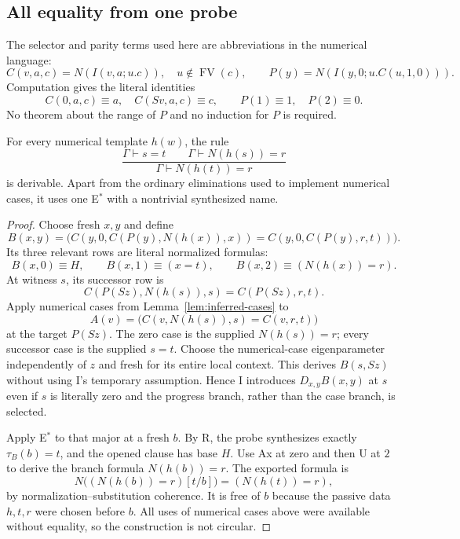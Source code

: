 \subsection{All equality from one probe}

The selector and parity terms used here are abbreviations in the numerical
language:
\[
 C(v,a,c)=N(I(v,a;u.c)),\quad u\notin\operatorname{FV}(c),
 \qquad P(y)=N(I(y,0;u.C(u,1,0))).
\]
Computation gives the literal identities
\[
 C(0,a,c)\equiv a,\quad C(Sv,a,c)\equiv c,
 \qquad P(1)\equiv1,\quad P(2)\equiv0.
\]
No theorem about the range of $P$ and no induction for $P$ is required.

\begin{theorem}
\label{thm:inferred-transport}
For every numerical template $h(w)$, the rule
\[
 \frac{\Gamma\vdash s=t\qquad\Gamma\vdash N(h(s))=r}
      {\Gamma\vdash N(h(t))=r}
\]
is derivable. Apart from the ordinary eliminations used to implement
numerical cases, it uses one E$^*$ with a nontrivial synthesized name.
\end{theorem}
\begin{proof}
Choose fresh $x,y$ and define
\[
 B(x,y)=
 \bigl(C(y,0,C(P(y),N(h(x)),x))
      =C(y,0,C(P(y),r,t))\bigr).
\]
Its three relevant rows are literal normalized formulas:
\[
 B(x,0)\equiv H,\qquad B(x,1)\equiv(x=t),\qquad
 B(x,2)\equiv(N(h(x))=r).
 \tag{R}
\]
At witness $s$, its successor row is
\[
 C(P(Sz),N(h(s)),s)=C(P(Sz),r,t).
\]
Apply numerical cases from Lemma~\ref{lem:inferred-cases} to
\[
 A(v)=\bigl(C(v,N(h(s)),s)=C(v,r,t)\bigr)
\]
at the target $P(Sz)$. The zero case is the supplied $N(h(s))=r$;
every successor case is the supplied $s=t$. Choose the numerical-case
eigenparameter independently of $z$ and fresh for its entire local context.
This derives $B(s,Sz)$ without using I's temporary assumption. Hence I
introduces $D_{x,y}B(x,y)$ at $s$ even if $s$ is literally zero and the
progress branch, rather than the case branch, is selected.

Apply E$^*$ to that major at a fresh $b$. By R, the probe synthesizes
exactly $\tau_B(b)=t$, and the opened clause has base $H$. Use Ax at zero
and then U at $2$ to derive the branch formula $N(h(b))=r$.
The exported formula is
\[
 N\bigl((N(h(b))=r)[t/b]\bigr)=(N(h(t))=r),
\]
by normalization--substitution coherence. It is free of $b$ because the
passive data $h,t,r$ were chosen before $b$. All uses of numerical cases
above were available without equality, so the construction is not circular.
\end{proof}

